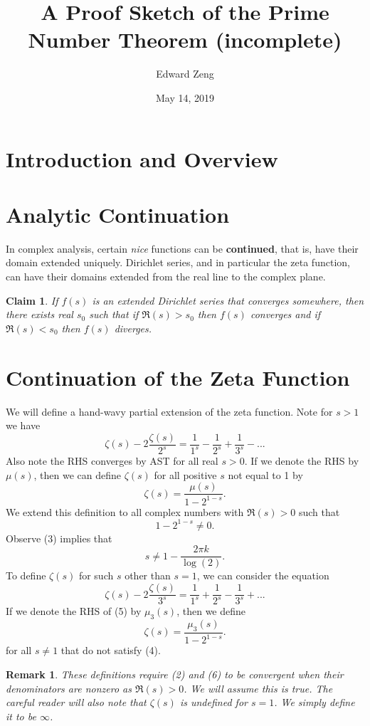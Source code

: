 \documentclass[12pt]{article}
\title{A Proof Sketch of the Prime Number Theorem (incomplete)}
\author{Edward Zeng}
\date{May 14, 2019}
\newtheorem{claim}{Claim}
\newtheorem*{remark}{Remark}
\begin{document}
\maketitle
\section{Introduction and Overview}

\section{Analytic Continuation}
In complex analysis, certain \textit{nice} functions can be \textbf{continued}, that is, have their domain extended uniquely. Dirichlet series, and in particular the zeta function, can have their domains extended from the real line to the complex plane.
\begin{claim}
    If $f(s)$ is an extended Dirichlet series that converges somewhere, then there exists real $s_{0}$ such that if $\Re(s) > s_{0}$ then $f(s)$ converges and if $\Re(s) < s_{0}$ then $f(s)$ diverges. 
\end{claim}

\section{Continuation of the Zeta Function}
We will define a hand-wavy partial extension of the zeta function. Note for $s > 1$ we have
\begin{equation}
    \zeta(s) - 2\frac{\zeta(s)}{2^{s}} = 
    \frac{1}{1^{s}} - \frac{1}{2^{s}} + \frac{1}{3^{s}} - ...
\end{equation}
Also note the RHS converges by AST for all real $s > 0$. If we denote the RHS by $\mu(s)$, then we can define $\zeta(s)$ for all positive $s$ not equal to 1 by
\begin{equation}
    \zeta(s) = \frac{\mu(s)}{1 - 2^{1-s}}.
\end{equation}
We extend this definition to all complex numbers with $\Re(s) > 0$ such that
\begin{equation}
    1 - 2^{1-s} \neq 0.
\end{equation}
Observe (3) implies that
\begin{equation}
    s \neq 1 - \frac{2\pi k}{\log(2)}.
\end{equation}
To define $\zeta(s)$ for such $s$ other than $s = 1$, we can consider the equation
\begin{equation}
    \zeta(s) - 2\frac{\zeta(s)}{3^{s}} = 
    \frac{1}{1^{s}} + \frac{1}{2^{s}} - \frac{1}{3^{s}} + ...
\end{equation}
If we denote the RHS of (5) by $\mu_{3}(s)$, then we define
\begin{equation}
    \zeta(s) = \frac{\mu_{3}(s)}{1 - 2^{1-s}}.
\end{equation}
for all $s \neq 1$ that do not satisfy (4).
\begin{remark}
    These definitions require (2) and (6) to be convergent when their denominators are nonzero as $\Re(s) > 0$. We will assume this is true. The careful reader will also note that $\zeta(s)$ is undefined for $s = 1$. We simply define it to be $\infty$.
\end{remark}
\end{document}

